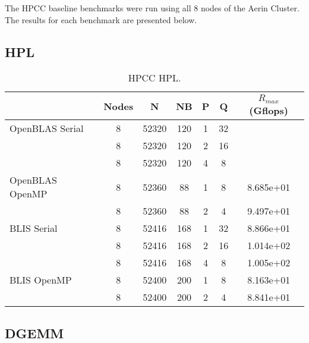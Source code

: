 The HPCC baseline benchmarks were run using all 8 nodes of the Aerin Cluster. The results for each benchmark are presented below.


%
%
\subsection{HPL}

\begin{table}[H]
\begin{center}
\begin{tabular}{ |l|c|c|c|c|c|c| } 
\hline
                & Nodes & N & NB & P & Q & $R_{max}$ (Gflops) \\ 
\hline
OpenBLAS Serial & 8 & 52320 & 120 & 1 & 32 & \\ 
                & 8 & 52320 & 120 & 2 & 16 & \\ 
                & 8 & 52320 & 120 & 4 & 8  & \\ 
\hline
OpenBLAS OpenMP & 8 & 52360 &  88 & 1 & 8  & 8.685e+01 \\ 
                & 8 & 52360 &  88 & 2 & 4  & 9.497e+01 \\ 
\hline
BLIS Serial     & 8 & 52416 & 168 & 1 & 32 & 8.866e+01 \\ 
                & 8 & 52416 & 168 & 2 & 16 & 1.014e+02 \\ 
                & 8 & 52416 & 168 & 4 & 8  & 1.005e+02 \\ 
\hline
BLIS OpenMP     & 8 & 52400 & 200 & 1 & 8  & 8.163e+01 \\ 
                & 8 & 52400 & 200 & 2 & 4  & 8.841e+01 \\ 
\hline
\end{tabular}
\end{center}
\caption{\label{tab:table-name}HPCC HPL.}
\end{table}


%
%
\subsection{DGEMM}


